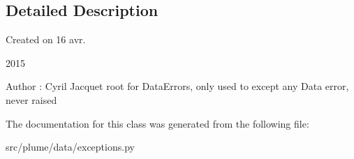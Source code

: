 \subsection{Detailed Description}
Created on 16 avr. 

2015

\begin{DoxyAuthor}{Author}
\+: Cyril Jacquet root for Data\+Errors, only used to except any Data error, never raised 
\end{DoxyAuthor}


The documentation for this class was generated from the following file\+:\begin{DoxyCompactItemize}
\item 
src/plume/data/exceptions.\+py\end{DoxyCompactItemize}
